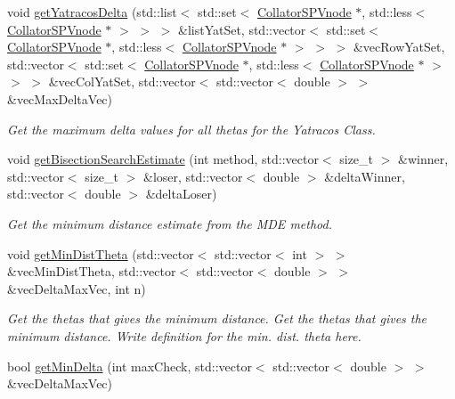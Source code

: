 \begin{DoxyCompactItemize}
\item 
void \hyperlink{classsubpavings_1_1AdaptiveHistogramVCollator_a741a4e9b7dac5673c641b3a991b4a419}{get\-Yatracos\-Delta} (std\-::list$<$ std\-::set$<$ \hyperlink{classsubpavings_1_1CollatorSPVnode}{\-Collator\-S\-P\-Vnode} $\ast$, std\-::less$<$ \hyperlink{classsubpavings_1_1CollatorSPVnode}{\-Collator\-S\-P\-Vnode} $\ast$ $>$ $>$ $>$ \&list\-Yat\-Set, std\-::vector$<$ std\-::set$<$ \hyperlink{classsubpavings_1_1CollatorSPVnode}{\-Collator\-S\-P\-Vnode} $\ast$, std\-::less$<$ \hyperlink{classsubpavings_1_1CollatorSPVnode}{\-Collator\-S\-P\-Vnode} $\ast$ $>$ $>$ $>$ \&vec\-Row\-Yat\-Set, std\-::vector$<$ std\-::set$<$ \hyperlink{classsubpavings_1_1CollatorSPVnode}{\-Collator\-S\-P\-Vnode} $\ast$, std\-::less$<$ \hyperlink{classsubpavings_1_1CollatorSPVnode}{\-Collator\-S\-P\-Vnode} $\ast$ $>$ $>$ $>$ \&vec\-Col\-Yat\-Set, std\-::vector$<$ std\-::vector$<$ double $>$ $>$ \&vec\-Max\-Delta\-Vec)
\begin{DoxyCompactList}\small\item\em \-Get the maximum delta values for all thetas for the \-Yatracos \-Class. \end{DoxyCompactList}\item 
void \hyperlink{classsubpavings_1_1AdaptiveHistogramVCollator_a6b81c529e7249fa666b288e24cbac5fd}{get\-Bisection\-Search\-Estimate} (int method, std\-::vector$<$ size\-\_\-t $>$ \&winner, std\-::vector$<$ size\-\_\-t $>$ \&loser, std\-::vector$<$ double $>$ \&delta\-Winner, std\-::vector$<$ double $>$ \&delta\-Loser)
\begin{DoxyCompactList}\small\item\em \-Get the minimum distance estimate from the \-M\-D\-E method. \end{DoxyCompactList}\item 
void \hyperlink{classsubpavings_1_1AdaptiveHistogramVCollator_a78eefcadb3a5247ce6712493b85976f9}{get\-Min\-Dist\-Theta} (std\-::vector$<$ std\-::vector$<$ int $>$ $>$ \&vec\-Min\-Dist\-Theta, std\-::vector$<$ std\-::vector$<$ double $>$ $>$ \&vec\-Delta\-Max\-Vec, int n)
\begin{DoxyCompactList}\small\item\em \-Get the thetas that gives the minimum distance. \-Get the thetas that gives the minimum distance. \-Write definition for the min. dist. theta here. \end{DoxyCompactList}\item 
bool \hyperlink{classsubpavings_1_1AdaptiveHistogramVCollator_adc9f2cb78559081ca925defe641bd583}{get\-Min\-Delta} (int max\-Check, std\-::vector$<$ std\-::vector$<$ double $>$ $>$ \&vec\-Delta\-Max\-Vec)

\end{DoxyCompactItemize}
